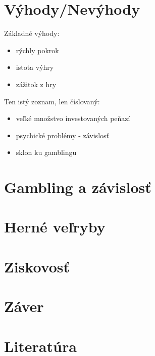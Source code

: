 \documentclass[10pt,twoside,slovak,a4paper]{article}
\begin{document}
\section{Výhody/Nevýhody} \label{3}


Základné výhody:

\begin{itemize}
\item rýchly pokrok
\item istota výhry
\item zážitok z hry 
\end{itemize}

Ten istý zoznam, len číslovaný:

\begin{itemize}
\item veľké množstvo investovaných peňazí
\item psychické problémy - závislosť
\item sklon ku gamblingu
\end{itemize}


\section{Gambling a závislosť} 



\section{Herné veľryby}




\section{Ziskovosť} 




\section{Záver}  %
\section{Literatúra} 
\end{document}
